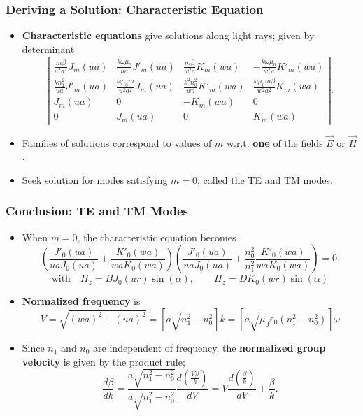 \documentclass{beamer}
\begin{document}
\begin{frame}
\frametitle{\textbf{Deriving a Solution:} Characteristic Equation}
\begin{itemize}
\item \textbf{Characteristic equations} give solutions along light rays; given by determinant
\begin{equation*}
\left|\begin{array}{cccc}
\frac{m\beta}{u^2a^2}J_m(ua)&\frac{k\omega\mu_0}{ua}J'_m(ua)&\frac{m\beta}{w^2a}K_m(wa)&-\frac{k\omega\mu_0}{w^2a}K'_m(wa)\\
\frac{kn_1^2}{ua}J'_m(ua)&\frac{\omega\mu_0m}{u^2a^2}J_m(ua)&\frac{k^2n_0^2}{wa}K'_m(wa)&\frac{\omega\mu_0m\beta}{w^2a^2}K_m(wa)\\
J_m(ua)&0&-K_m(wa)&0\\
0&J_m(ua)&0&K_m(wa)
\end{array}\right|.
\end{equation*}
\item Families of solutions correspond to values of $m$ w.r.t. \textbf{one} of the fields $\vec{E}$ or $\vec{H}$.
\item Seek solution for modes satisfying $m=0$, called the TE and TM modes.
\end{itemize}
\end{frame}

\begin{frame}
\frametitle{\textbf{Conclusion:} TE and TM Modes}
\begin{itemize}
\item When $m=0$, the characteristic equation becomes
\begin{equation*}
\left(\frac{J'_0(ua)}{uaJ_0(ua)}+\frac{K'_0(wa)}{waK_0(wa)}\right)\left(\frac{J'_0(ua)}{ua J_0(ua)}+\frac{n_0^2}{n_1^2}\frac{K'_0(wa)}{wa K_0(wa)}\right)=0\nonumber.
\end{equation*}
\begin{equation*}
\mbox{with}\quad H_z=BJ_0(ur)\sin{(\alpha)},\qquad H_z=DK_0(wr)\sin{(\alpha)}
\end{equation*}
\item \textbf{Normalized frequency} is $$V=\sqrt{(wa)^2+(ua)^2}=\left[a\sqrt{n_1^2-n_0^2}\right]k=\left[a\sqrt{\mu_0\varepsilon_0(n_1^2-n_0^2)}\right]\omega$$
\item Since $n_1$ and $n_0$ are independent of frequency, the \textbf{normalized group velocity} is given by the product rule; $$\frac{d\beta}{d k}=\frac{a\sqrt{n_1^2-n_0^2}}{a\sqrt{n_1^2-n_0^2}}\frac{d(\frac{V\beta}{k})}{dV}=V\frac{d\left(\frac{\beta}{k}\right)}{dV}+\frac{\beta}{k}.$$
\end{itemize}
\end{frame}
\end{document}
